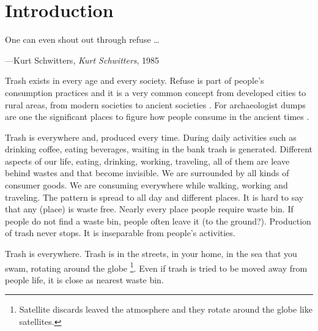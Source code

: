 \chapter{Introduction}

\epigraph{One can even shout out through refuse \ldots}{\hfill---Kurt Schwitters, \textit{Kurt Schwitters}, 1985}





%
%
\comment{[Every.]}

Trash exists in every age and every society. Refuse is part of people's consumption practices and it is a very common concept from developed cities to rural areas, from modern societies to ancient societies\cite[p.33]{rathje1992rubbish} . For archaeologist dumps are one the significant places to figure how people consume in the ancient times .

Trash is everywhere and, produced every time. During daily activities such as drinking coffee, eating beverages, waiting in the bank trash is generated. Different aspects of our life, eating, drinking, working, traveling, all of them are leave behind wastes and that become invisible. We are surrounded by all kinds of consumer goods. We are consuming everywhere while walking, working and traveling. The pattern is spread to all day and different places. It is hard to say that any (place) is waste free. Nearly every place people require waste bin. If people do not find a waste bin, people often leave it (to the ground?). Production of trash never stops. It is inseparable from people's activities. 

Trash is everywhere. Trash is in the streets, in your home, in the sea that you swam, rotating around the globe \footnote{Satellite discards leaved the atmosphere and they rotate around the globe like satellites.}. Even if trash is tried to be moved away from people life, it is close as nearest waste bin.

\comment{[Global.]}





